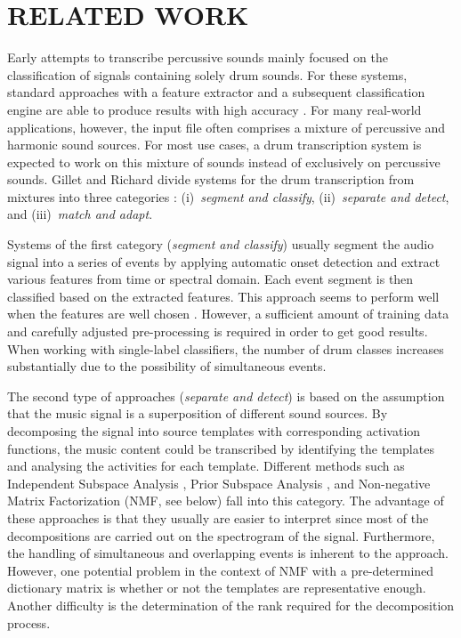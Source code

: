 \documentclass{article}
\begin{document}
\section{RELATED WORK}\label{sec:related work}

Early attempts to transcribe percussive sounds mainly focused on the classification of signals containing solely drum sounds. For these systems, standard approaches with a feature extractor and a subsequent classification engine are able to produce results with high accuracy \cite{%
herrera_automatic_2003}. For many real-world applications, however, the input file often comprises a mixture of percussive and harmonic sound sources. For most use cases, a drum transcription system is expected to work on this mixture of sounds instead of exclusively on percussive sounds. 
Gillet and Richard divide systems for the drum transcription from mixtures into three categories \cite{gillet_transcription_2008}: (i)~\textit{segment and classify}, (ii)~\textit{separate and detect}, and (iii)~\textit{match and adapt}.  

Systems of the first category (\textit{segment and classify}) usually segment the audio signal into a series of events by applying automatic onset detection and extract various features from time or spectral domain. Each event segment is then classified based on the extracted features. 
This approach seems to perform well when the features are well chosen \cite{gillet_automatic_2004, dittmar_drum_2005}. However, a sufficient amount of training data and carefully adjusted pre-processing is required in order to get good results. When working with single-label classifiers, the number of drum classes increases substantially due to the possibility of simultaneous events.

The second type of approaches (\textit{separate and detect}) is based on the assumption that the music signal is a superposition of different sound sources. By decomposing the signal into source templates with corresponding activation functions, the music content could be transcribed by identifying the templates and analysing the activities for each template. 
Different methods such as Independent Subspace Analysis \cite{fitzgerald_sub-band_2002}, Prior Subspace Analysis \cite{fitzgerald_drum_2003}, and Non-negative Matrix Factorization (NMF, see below) \cite{moreau_drum_2007,alves_drum_2009} fall into this category. The advantage of these approaches is that they usually are easier to interpret since most of the decompositions are carried out on the spectrogram of the signal. Furthermore, the handling of simultaneous and overlapping events is inherent to the approach. However, one potential problem in the context of NMF with a pre-determined dictionary matrix is whether or not the templates are representative enough. Another difficulty is the determination of the rank required for the decomposition process. 
\end{document}
